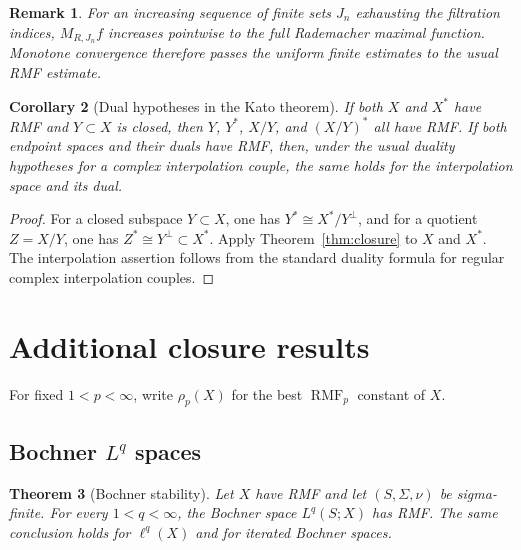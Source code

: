 \documentclass[11pt]{article}
\newtheorem{theorem}{Theorem}[section]
\newtheorem{corollary}[theorem]{Corollary}
\newtheorem{remark}[theorem]{Remark}
\theoremstyle{definition}
\newcommand{\RMF}{\operatorname{RMF}}
\newcommand{\1}{\mathbf 1}
\begin{document}
\begin{remark}
For an increasing sequence of finite sets $J_n$ exhausting the filtration
indices, $M_{R,J_n}f$ increases pointwise to the full Rademacher maximal
function.  Monotone convergence therefore passes the uniform finite estimates
to the usual RMF estimate.
\end{remark}

\begin{corollary}[Dual hypotheses in the Kato theorem]
If both $X$ and $X^*$ have RMF and $Y\subset X$ is closed, then $Y$, $Y^*$,
$X/Y$, and $(X/Y)^*$ all have RMF.  If both endpoint spaces and their duals have
RMF, then, under the usual duality hypotheses for a complex interpolation couple,
the same holds for the interpolation space and its dual.
\end{corollary}

\begin{proof}
For a closed subspace $Y\subset X$, one has
$Y^*\cong X^*/Y^\perp$, and for a quotient $Z=X/Y$, one has
$Z^*\cong Y^\perp\subset X^*$.  Apply Theorem~\ref{thm:closure} to $X$ and
$X^*$.  The interpolation assertion follows from the standard duality formula
for regular complex interpolation couples.
\end{proof}

\section{Additional closure results}

For fixed $1<p<\infty$, write $\rho_p(X)$ for the best $\RMF_p$ constant of
$X$.

\subsection{Bochner \texorpdfstring{$L^q$}{Lq} spaces}

\begin{theorem}[Bochner stability]\label{thm:bochner}
Let $X$ have RMF and let $(S,\Sigma,\nu)$ be sigma-finite.  For every
$1<q<\infty$, the Bochner space $L^q(S;X)$ has RMF.  The same conclusion holds
for $\ell^q(X)$ and for iterated Bochner spaces.
\end{theorem}
\end{document}
